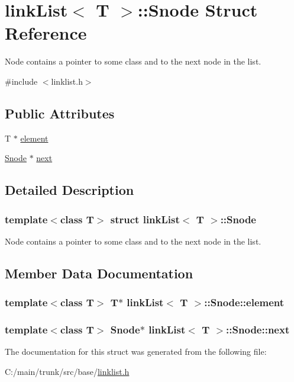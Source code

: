 \hypertarget{structlink_list_1_1_snode}{
\section{linkList$<$ T $>$::Snode Struct Reference}
\label{structlink_list_1_1_snode}
}


Node contains a pointer to some class and to the next node in the list.  


{\ttfamily \#include $<$linklist.h$>$}\subsection*{Public Attributes}
\begin{DoxyCompactItemize}
\item 
T $\ast$ \hyperlink{structlink_list_1_1_snode_acb14b868acbf854a0c1be65d99a00c01}{element}
\item 
\hyperlink{structlink_list_1_1_snode}{Snode} $\ast$ \hyperlink{structlink_list_1_1_snode_a19d2525de9ac2d77d7770850e52976e1}{next}
\end{DoxyCompactItemize}


\subsection{Detailed Description}
\subsubsection*{template$<$class T$>$ struct linkList$<$ T $>$::Snode}

Node contains a pointer to some class and to the next node in the list. 

\subsection{Member Data Documentation}
\hypertarget{structlink_list_1_1_snode_acb14b868acbf854a0c1be65d99a00c01}{
\subsubsection[{element}]{\setlength{\rightskip}{0pt plus 5cm}template$<$class T$>$ T$\ast$ {\bf linkList}$<$ T $>$::{\bf Snode::element}}}
\label{structlink_list_1_1_snode_acb14b868acbf854a0c1be65d99a00c01}
\hypertarget{structlink_list_1_1_snode_a19d2525de9ac2d77d7770850e52976e1}{
\subsubsection[{next}]{\setlength{\rightskip}{0pt plus 5cm}template$<$class T$>$ {\bf Snode}$\ast$ {\bf linkList}$<$ T $>$::{\bf Snode::next}}}
\label{structlink_list_1_1_snode_a19d2525de9ac2d77d7770850e52976e1}


The documentation for this struct was generated from the following file:\begin{DoxyCompactItemize}
\item 
C:/main/trunk/src/base/\hyperlink{linklist_8h}{linklist.h}\end{DoxyCompactItemize}
